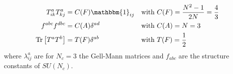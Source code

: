 \begin{align}
T^a_{ik} T^a_{kj} &= C(F)\mathbbm{1}_{ij} && \mbox{with}\ C(F) = \frac{N^2-1}{2N} = \frac{4}{3}\nonumber\\
f^{abc} f^{dbc} &= C(A)\delta^{ad} && \mbox{with}\ C(A) = N = 3\nonumber\\
\mathrm{Tr}\left[T^aT^b\right] &= T(F)\delta^{ab} && \mbox{with}\ T(F) = \frac{1}{2}\label{eq:DynkinIndex}
\end{align}
where $\lambda^a_{ij}$ are for $N_c = 3$ the Gell-Mann matrices and $f_{abc}$ are the structure constants of $SU(N_c)$.



